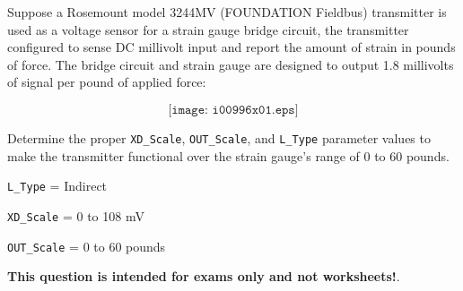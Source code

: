 

Suppose a Rosemount model 3244MV (FOUNDATION Fieldbus) transmitter is used as a voltage sensor for a strain gauge bridge circuit, the transmitter configured to sense DC millivolt input and report the amount of strain in pounds of force.  The bridge circuit and strain gauge are designed to output 1.8 millivolts of signal per pound of applied force:

$$\texttt{[image: i00996x01.eps]}$$

Determine the proper {\tt XD\_Scale}, {\tt OUT\_Scale}, and {\tt L\_Type} parameter values to make the transmitter functional over the strain gauge's range of 0 to 60 pounds.







{\tt L\_Type} = Indirect

\vskip 10pt

{\tt XD\_Scale} = 0 to 108 mV

\vskip 10pt

{\tt OUT\_Scale} = 0 to 60 pounds







{\bf This question is intended for exams only and not worksheets!}.



